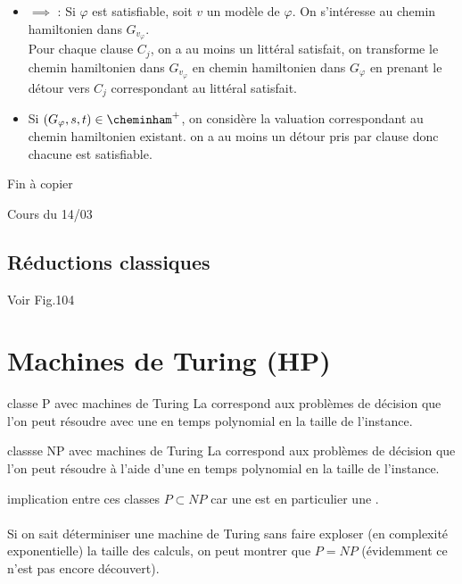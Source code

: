 \begin{demonstration}
\begin{itemize}
            \item $\boxed{\implies}$ : Si $\varphi$ est satisfiable, soit $v$ un modèle de $\varphi$. On s'intéresse au chemin hamiltonien dans $G_{v_\varphi}$.\\
            Pour chaque clause $C_j$, on a au moins un littéral satisfait, on transforme le chemin hamiltonien dans $G_{v_\varphi}$ en chemin hamiltonien dans $G_\varphi$ en prenant le détour vers $C_j$ correspondant au littéral satisfait.
            \item Si $(G_\varphi, s, t) \in \cheminham^+$, on considère la valuation correspondant au chemin hamiltonien existant. on a au moins un détour pris par clause donc chacune est satisfiable.
        \end{itemize}
\end{demonstration}

Fin à copier


Cours du 14/03
\subsection{Réductions classiques}

Voir Fig.104

\section{Machines de Turing (HP)}

\begin{definition}{}{classe P avec machines de Turing}
    La  correspond aux problèmes de décision que l'on peut résoudre avec une  en temps polynomial en la taille de l'instance.
\end{definition}

\begin{definition}{}{classse NP avec machines de Turing}
    La  correspond aux problèmes de décision que l'on peut résoudre à l'aide d'une  en temps polynomial en la taille de l'instance.
\end{definition}

\begin{remarque}{}{implication entre ces classes}
    $P \subset NP$ car une  est en particulier une .\\\\
    Si on sait déterminiser une machine de Turing sans faire exploser (en complexité exponentielle) la taille des calculs, on peut montrer que $P=  NP$ (évidemment ce n'est pas encore découvert).
\end{remarque}

